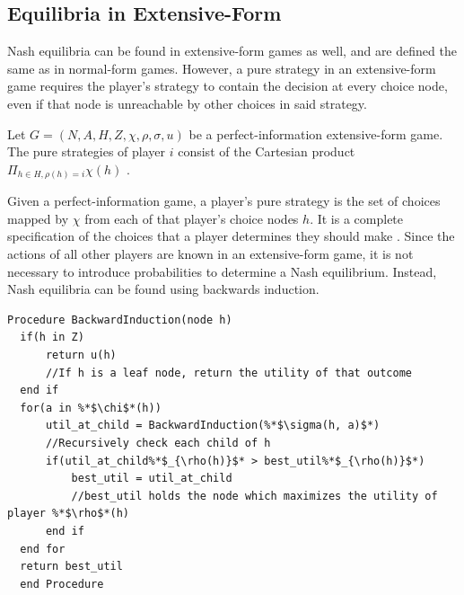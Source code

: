 \subsection{Equilibria in Extensive-Form}
Nash equilibria can be found in extensive-form games as well, and are defined the same as in normal-form games. However, a pure strategy in an extensive-form game requires the player's strategy to contain the decision at every choice node, even if that node is unreachable by other choices in said strategy.\\
\begin{define}
  Let $G = (N, A, H, Z, \chi, \rho, \sigma, u)$ be a perfect-information extensive-form game. The pure strategies of player $i$ consist of the Cartesian product $\Pi_{h\in H, \rho(h)=i}\chi(h)$ \cite{shoh09}.
\end{define}
Given a perfect-information game, a player's pure strategy is the set of choices mapped by $\chi$ from each of that player's choice nodes $h$. It is a complete specification of the choices that a player determines they should make \cite{shoh09}. Since the actions of all other players are known in an extensive-form game, it is not necessary to introduce probabilities to determine a Nash equilibrium. Instead, Nash equilibria can be found using backwards induction.

\begin{lstlisting}[language=pseudocode]
  Procedure BackwardInduction(node h)
  if(h in Z)
      return u(h)
      //If h is a leaf node, return the utility of that outcome
  end if
  for(a in %*$\chi$*(h))
      util_at_child = BackwardInduction(%*$\sigma(h, a)$*)
      //Recursively check each child of h
      if(util_at_child%*$_{\rho(h)}$* > best_util%*$_{\rho(h)}$*)
          best_util = util_at_child
          //best_util holds the node which maximizes the utility of player %*$\rho$*(h)
      end if
  end for
  return best_util
  end Procedure
\end{lstlisting}

